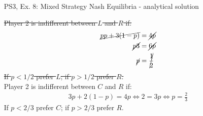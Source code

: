 \begin{frame}{PS3, Ex. 8: Mixed Strategy Nash Equilibria - analytical solution}
\begin{multicols}{2}
    \sout{Player 2 is indifferent between $L$ and $R$ if:}
    \begin{align*}
      \cancel{pp+3(1-p)}&= \cancel{4p } \\
      \cancel{p3}       &= \cancel{6p } \\
      \cancel{p}        &= \cancel{\frac{1}{2} }
    \end{align*}
    \sout{If $p<1/2$ prefer $L$; if $p>1/2$ prefer $R$.}\\\medskip
    Player 2 is indifferent between $C$ and $R$ if:
    \begin{align*}
      3p+2(1-p) = 4p \Leftrightarrow 2 = 3p \Leftrightarrow p = \frac{2}{3}
    \end{align*}
    If $p<2/3$ prefer $C$; if $p>2/3$ prefer $R$.\\\medskip
  \vfill\null
  \end{multicols}
\end{frame}
